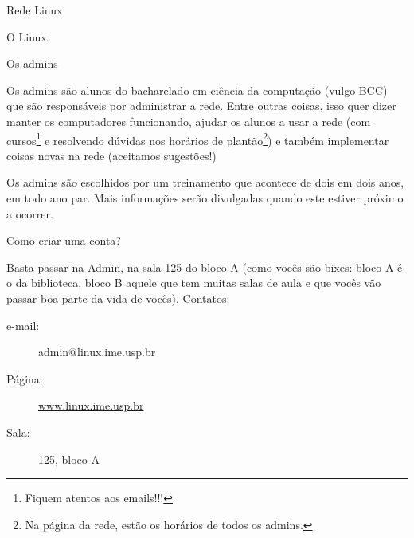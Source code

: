 \begin{subsecao}{Rede Linux}
\begin{subsubsecao}{O Linux}
\end{subsubsecao}

\begin{subsubsecao}{Os admins}

Os admins são alunos do bacharelado em ciência da computação (vulgo BCC) que
são responsáveis por administrar a rede. Entre outras coisas, isso quer dizer
manter os computadores funcionando, ajudar os alunos a usar a rede (com
cursos\footnote{ Fiquem atentos aos emails!!!} e resolvendo dúvidas nos
horários de plantão\footnote{ Na página da rede, estão os horários de todos os
admins.}) e também implementar coisas novas na rede (aceitamos sugestões!)

Os admins são escolhidos por um treinamento que acontece de dois em dois anos,
em todo ano par. Mais informações serão divulgadas quando este estiver próximo
a ocorrer.

\end{subsubsecao}
\begin{subsubsecao}{Como criar uma conta?}

Basta passar na Admin, na sala 125 do bloco A (como vocês são bixes: bloco A é o da
biblioteca, bloco B aquele que tem muitas salas de aula e que vocês vão passar boa
parte da vida de vocês). Contatos:

\vspace{-1em}

\begin{description}
\item [e-mail:] admin@linux.ime.usp.br
\item [Página:] \url{www.linux.ime.usp.br}
\item [Sala:] 125, bloco A
\end{description}

\vspace{-.5em}

\end{subsubsecao}

\end{subsecao}
